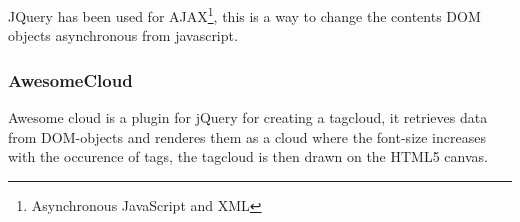 JQuery has been used for AJAX\footnote{Asynchronous JavaScript and XML}, this is a way to change the contents DOM objects asynchronous from javascript.

\subsubsection{AwesomeCloud}
Awesome cloud is a plugin for jQuery for creating a tagcloud, it retrieves data from DOM-objects and renderes them as a cloud where the font-size increases with the occurence of tags, the tagcloud is then drawn on the HTML5 canvas.
